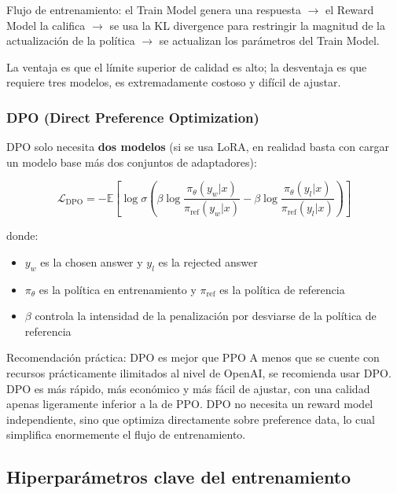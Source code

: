 Flujo de entrenamiento: el Train Model genera una respuesta $\rightarrow$ el Reward Model la califica $\rightarrow$ se usa la KL divergence para restringir la magnitud de la actualización de la política $\rightarrow$ se actualizan los parámetros del Train Model.

La ventaja es que el límite superior de calidad es alto; la desventaja es que requiere tres modelos, es extremadamente costoso y difícil de ajustar.

\subsubsection{DPO (Direct Preference Optimization)}

DPO solo necesita \textbf{dos modelos} (si se usa LoRA, en realidad basta con cargar un modelo base más dos conjuntos de adaptadores):

$$\mathcal{L}_{\text{DPO}} = -\mathbb{E}\left[\log \sigma\left(\beta \log \frac{\pi_\theta(y_w|x)}{\pi_{\text{ref}}(y_w|x)} - \beta \log \frac{\pi_\theta(y_l|x)}{\pi_{\text{ref}}(y_l|x)}\right)\right]$$

donde:
\begin{itemize}
    \item $y_w$ es la chosen answer y $y_l$ es la rejected answer
    \item $\pi_\theta$ es la política en entrenamiento y $\pi_{\text{ref}}$ es la política de referencia
    \item $\beta$ controla la intensidad de la penalización por desviarse de la política de referencia
\end{itemize}

\begin{importantbox}{Recomendación práctica: DPO es mejor que PPO}
A menos que se cuente con recursos prácticamente ilimitados al nivel de OpenAI, se recomienda usar DPO. DPO es más rápido, más económico y más fácil de ajustar, con una calidad apenas ligeramente inferior a la de PPO. DPO no necesita un reward model independiente, sino que optimiza directamente sobre preference data, lo cual simplifica enormemente el flujo de entrenamiento.
\end{importantbox}

\subsection{Hiperparámetros clave del entrenamiento}

